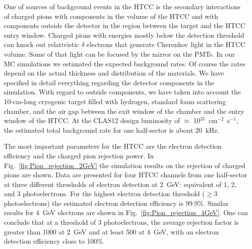 One of sources of background events in the HTCC is the secondary interactions of charged pions with components
in the volume of the HTCC and with components outside the detector in the region between the target and the
HTCC entry window. Charged pions with energies mostly below the detection threshold can knock out relativistic
$\delta$ electrons that generate Cherenkov light in the HTCC volume. Some of that light can be focused by the
mirror on the PMTs. In our MC simulations we estimated the expected background rates. Of course the rates
depend on the actual thickness and distribution of the materials. We have specified in detail  everything regarding
the detector components in the simulation. With regard to outside components, we have taken into account the
10-cm-long cryogenic target filled with hydrogen, standard foam scattering chamber, and the air gap between the
exit window of the chamber and the entry window of the HTCC. At the CLAS12 design luminosity of
$\approx$ 10$^{35}$~cm$^{-2}$~s$^{-1}$, the estimated total background rate for one half-sector is about
20~kHz.

The most important parameters for the HTCC are the electron detection efficiency and the charged pion rejection
power. In Fig.~\ref{fig:Pion_rejection_2GeV} the simulation results on the rejection of charged pions are shown.
Data are presented for four HTCC channels from one half-sector at three different thresholds of electron
detection at 2~GeV: equivalent of 1, 2, and 3 photoelectrons. For the highest electron detection threshold ($\ge$3
photoelectrons) the estimated electron detection efficiency is 99.9\%. Similar results for 4~GeV electrons are
shown in Fig.~\ref{fig:Pion_rejection_4GeV}. One can conclude that at a threshold of 3 photoelectrons, the
average rejection factor is greater than 1000 at 2~GeV and at least 500 at 4~GeV, with an electron detection
efficiency close to 100\%.

